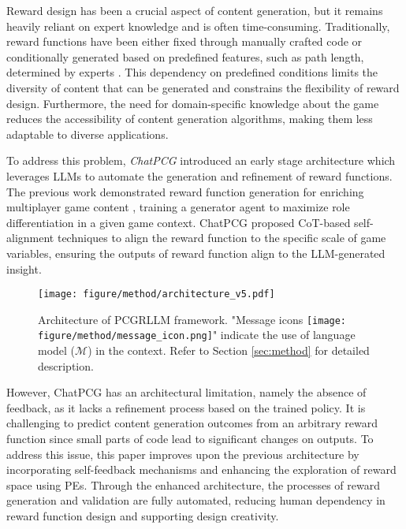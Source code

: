 
Reward design has been a crucial aspect of content generation, but it remains heavily reliant on expert knowledge and is often time-consuming. Traditionally, reward functions have been either fixed through manually crafted code \cite{khalifa2020pcgrl} or conditionally generated based on predefined features, such as path length, determined by experts \cite{earle2021learning}. This dependency on predefined conditions limits the diversity of content that can be generated and constrains the flexibility of reward design. Furthermore, the need for domain-specific knowledge about the game reduces the accessibility of content generation algorithms, making them less adaptable to diverse applications.


To address this problem, \textit{ChatPCG} \cite{baek2024chatpcg} introduced an early stage architecture which leverages LLMs to automate the generation and refinement of reward functions.
The previous work demonstrated reward function generation for enriching multiplayer game content \cite{jeon2023raidenv}, training a generator agent to maximize role differentiation in a given game context.
ChatPCG proposed CoT-based self-alignment techniques to align the reward function to the specific scale of game variables, ensuring the outputs of reward function align to the LLM-generated insight.

\begin{figure*}[th]
    \centering
    \texttt{[image: figure/method/architecture\_v5.pdf]}
    \caption{Architecture of PCGRLLM framework. "Message icons \texttt{[image: figure/method/message\_icon.png]}" indicate the use of language model ($\mathcal{M}$) in the context. Refer to Section \ref{sec:method} for detailed description.}
    \label{fig:architecture}
    \vspace{-0.34cm}
\end{figure*}


However, ChatPCG has an architectural limitation, namely the absence of feedback, as it lacks a refinement process based on the trained policy.
It is challenging to predict content generation outcomes from an arbitrary reward function since small parts of code lead to significant changes on outputs.
To address this issue, this paper improves upon the previous architecture by incorporating self-feedback mechanisms and enhancing the exploration of reward space using PEs. Through the enhanced architecture, the processes of reward generation and validation are fully automated, reducing human dependency in reward function design and supporting design creativity.